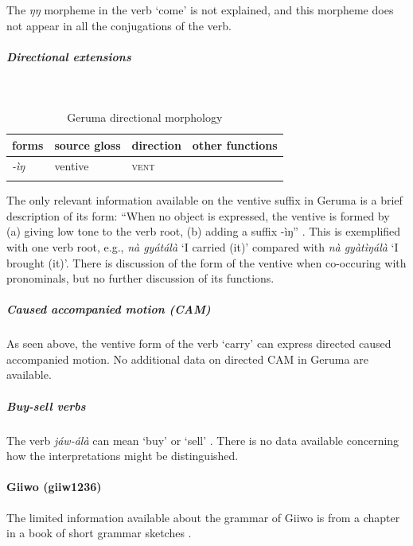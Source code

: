 The \textit{ŋŋ} morpheme in the verb `come' is not explained, and this morpheme does not appear in all the conjugations of the verb. 

\subparagraph{Directional extensions}~



\begin{table}[H]
	\caption{Geruma directional morphology}
	\label{tab:geru}
	\begin{tabular}{llll} %
		\lsptoprule
		forms & source gloss & direction  & other functions  \\ %
		\midrule
		\textit{-ìŋ}  & ventive   &   \textsc{vent} &     \\
		\lspbottomrule
	\end{tabular}
\end{table} 

The only relevant information available on the ventive suffix in Geruma is a brief description of its form: ``When no object is expressed, the ventive is formed by (a) giving low tone to the verb root, (b) adding a suffix -ìŋ'' \citep[127]{schuhBoleTangaleLanguagesBauchi1978}. This is exemplified with one verb root, e.g., \textit{nà gyátálà} ‘I carried (it)’ compared with \textit{nà gyàtìŋálà} ‘I brought (it)’. There is discussion of the form of the ventive when co-occuring with pronominals, but no further discussion of its functions.

\subparagraph{Caused accompanied motion (CAM)}



As seen above, the ventive form of the verb `carry' can express directed caused accompanied motion. No additional data on directed CAM in Geruma are available. 

\subparagraph{Buy-sell verbs}



The verb \textit{jáw-álà} can mean `buy' or `sell' \citep[136]{schuhBoleTangaleLanguagesBauchi1978}. There is no data available concerning how the interpretations might be distinguished. 

\paragraph*{Giiwo (giiw1236)} \label{giiw} 

The limited information available about the grammar of Giiwo is from a chapter in a book of short grammar sketches \citep{schuhBoleTangaleLanguagesBauchi1978}. 

